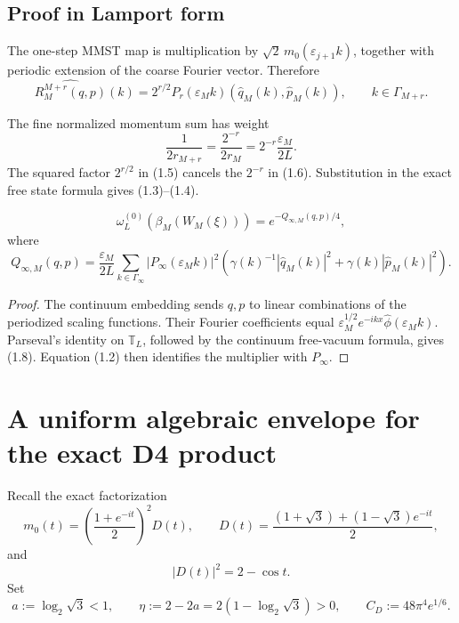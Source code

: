 \documentclass[11pt,a4paper]{article}
\newcommand{\eps}{\varepsilon}
\newcommand{\T}{\mathbb T}
\begin{document}
\subsection*{Proof in Lamport form}


The one-step MMST map is multiplication by
\(\sqrt2\,m_0(\eps_{j+1}k)\), together with periodic extension of the
coarse Fourier vector.  Therefore
\[
 \widehat{R_M^{M+r}(q,p)}(k)
 =2^{r/2}P_r(\eps_Mk)
   (\widehat q_M(k),\widehat p_M(k)),
 \qquad k\in\Gamma_{M+r}.                                      \tag{1.5}
\]


The fine normalized momentum sum has weight
\[
 \frac1{2r_{M+r}}=\frac{2^{-r}}{2r_M}
 =2^{-r}\frac{\eps_M}{2L}.                                    \tag{1.6}
\]
The squared factor \(2^{r/2}\) in (1.5) cancels the \(2^{-r}\) in
(1.6).  Substitution in the exact free state formula gives (1.3)--(1.4).
\QedStep

\begin{lemma}\label{lem:ctcov}
\[
 \omega_L^{(0)}(\beta_M(W_M(\xi)))=e^{-Q_{\infty,M}(q,p)/4},   \tag{1.7}
\]
where
\[
 Q_{\infty,M}(q,p)
 =\frac{\eps_M}{2L}\sum_{k\in\Gamma_\infty}
 |P_\infty(\eps_Mk)|^2
 \left(\gamma(k)^{-1}|\widehat q_M(k)|^2
       +\gamma(k)|\widehat p_M(k)|^2\right).                   \tag{1.8}
\]
\end{lemma}

\begin{proof}
The continuum embedding sends \(q,p\) to linear combinations of the periodized
scaling functions.  Their Fourier coefficients equal
\(\eps_M^{1/2}e^{-ikx}\widehat\phi(\eps_Mk)\).  Parseval's identity on
\(\T_L\), followed by the continuum free-vacuum formula, gives (1.8).
Equation (1.2) then identifies the multiplier with \(P_\infty\).
\end{proof}

\section{A uniform algebraic envelope for the exact D4 product}

Recall the exact factorization
\[
 m_0(t)=\left(\frac{1+e^{-it}}2\right)^2D(t),\qquad
 D(t)=\frac{(1+\sqrt3)+(1-\sqrt3)e^{-it}}2,                    \tag{2.1}
\]
and
\[
 |D(t)|^2=2-\cos t.                                            \tag{2.2}
\]
Set
\[
 a:=\log_2\sqrt3<1,\qquad
 \eta:=2-2a=2(1-\log_2\sqrt3)>0,\qquad
 C_D:=48\pi^4e^{1/6}.                                         \tag{2.3}
\]
\end{document}
